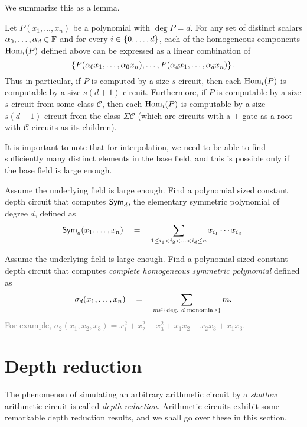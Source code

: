We summarize this as a lemma. 

\begin{lemma}\label{lem:computing-hom-components}
Let $P(x_1,\ldots, x_n)$ be a polynomial with $\deg P = d$. For any set of distinct scalars $\alpha_0, \ldots, \alpha_{d} \in \mathbb{F}$ and for every $i \in \left\{0,\ldots, d\right\}$,  each of the homogeneous components $\operatorname{Hom}_i(P)$ defined above can be expressed as a linear combination of 
\[
\left\{P(\alpha_0x_1,\ldots, \alpha_0x_n), \ldots, P(\alpha_dx_1,\ldots, \alpha_dx_n)\right\}.
\]
Thus in particular, if $P$ is computed by a size $s$ circuit, then each $\operatorname{Hom}_i(P)$ is computable  by a size $s(d+1)$ circuit. Furthermore, if $P$ is computable by a size $s$ circuit from some class $\mathcal{C}$, then each $\operatorname{Hom}_i(P)$ is computable by a size $s(d+1)$ circuit from the class $\Sigma \mathcal{C}$ (which are circuits with a $+$ gate as a root with $\mathcal{C}$-circuits as its children).
\end{lemma}

It is important to note that for interpolation, we need to be able to find sufficiently many distinct elements in the base field, and this is possible only if the base field is large enough. 

\begin{exercise}
Assume the underlying field is large enough. Find a polynomial sized constant depth circuit that computes $\operatorname{\mathsf{Sym}}_d$, the elementary symmetric polynomial of degree $d$, defined as
\[
\operatorname{\mathsf{Sym}}_{d}(x_1,\ldots, x_n) \quad = \quad \sum_{1\leq i_1 < i_2 < \cdots < i_d \leq n} x_{i_1} \cdots x_{i_d}.
\]
\end{exercise}

\begin{exercise}
Assume the underlying field is large enough. Find a polynomial sized constant depth circuit that computes \emph{complete homogeneous symmetric polynomial} defined as
\[
\sigma_d(x_1,\ldots, x_n) \quad = \quad \sum_{m \in \left\{\text{deg. $d$ monomials}\right\}} m.
\]
\textcolor{gray}{For example, $\sigma_2(x_1,x_2,x_3) = x_1^2 + x_2^2 + x_3^2 + x_1x_2 + x_2x_3 + x_1x_3$.}
\end{exercise}


\section{Depth reduction}

The phenomenon of simulating an arbitrary arithmetic circuit by a \emph{shallow} arithmetic circuit is called \emph{depth reduction}. 
Arithmetic circuits exhibit some remarkable depth reduction results, and we shall go over these in this section. 

